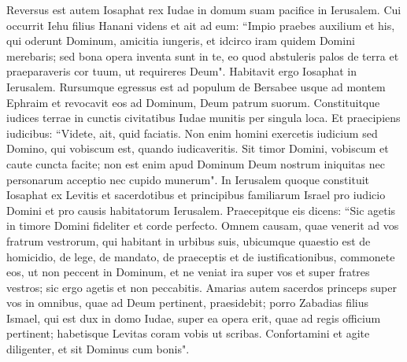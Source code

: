 \begin{biblechapter}  
\verse Reversus est autem Iosaphat rex Iudae in domum suam pacifice in Ierusalem. 
\verse Cui occurrit Iehu filius Hanani videns et ait ad eum: “Impio praebes auxilium et his, qui oderunt Dominum, amicitia iungeris, et idcirco iram quidem Domini merebaris; 
\verse sed bona opera inventa sunt in te, eo quod abstuleris palos de terra et praeparaveris cor tuum, ut requireres Deum". 
\verse Habitavit ergo Iosaphat in Ierusalem. Rursumque egressus est ad populum de Bersabee usque ad montem Ephraim et revocavit eos ad Dominum, Deum patrum suorum. 
\verse Constituitque iudices terrae in cunctis civitatibus Iudae munitis per singula loca. 
\verse Et praecipiens iudicibus: “Videte, ait, quid faciatis. Non enim homini exercetis iudicium sed Domino, qui vobiscum est, quando iudicaveritis. 
\verse Sit timor Domini, vobiscum et caute cuncta facite; non est enim apud Dominum Deum nostrum iniquitas nec personarum acceptio nec cupido munerum". 
\verse In Ierusalem quoque constituit Iosaphat ex Levitis et sacerdotibus et principibus familiarum Israel pro iudicio Domini et pro causis habitatorum Ierusalem. 
\verse Praecepitque eis dicens: “Sic agetis in timore Domini fideliter et corde perfecto. 
\verse Omnem causam, quae venerit ad vos fratrum vestrorum, qui habitant in urbibus suis, ubicumque quaestio est de homicidio, de lege, de mandato, de praeceptis et de iustificationibus, commonete eos, ut non peccent in Dominum, et ne veniat ira super vos et super fratres vestros; sic ergo agetis et non peccabitis. 
\verse Amarias autem sacerdos princeps super vos in omnibus, quae ad Deum pertinent, praesidebit; porro Zabadias filius Ismael, qui est dux in domo Iudae, super ea opera erit, quae ad regis officium pertinent; habetisque Levitas coram vobis ut scribas. Confortamini et agite diligenter, et sit Dominus cum bonis". 
\end{biblechapter}


